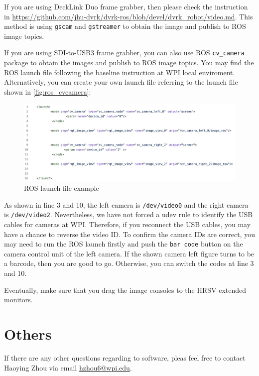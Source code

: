 If you are using DeckLink Duo frame grabber, then please check the instruction in \url{https://github.com/jhu-dvrk/dvrk-ros/blob/devel/dvrk_robot/video.md}. This method is using \texttt{gscam} and \texttt{gstreamer} to obtain the image and publish to ROS image topics.

If you are using SDI-to-USB3 frame grabber, you can also use ROS \texttt{cv\_camera} package to obtain the images and publish to ROS image topics. You may find the ROS launch file following the baseline instruction at WPI local enviroment. Alternatively, you can create your own launch file referring to the launch file shown in \autoref{fig:ros_cvcamera}:

\begin{figure}[H]
    \centering
    \includegraphics[width=0.95\linewidth]{figures/roslaunch_cvcamera.jpg}
    \caption{ROS launch file example}
    \label{fig:ros_cvcamera}
\end{figure}

As shown in line 3 and 10, the left camera is \texttt{\slash dev\slash video0} and the right camera is \texttt{\slash dev\slash video2}. Nevertheless, we have not forced a udev rule to identify the USB cables for cameras at WPI. Therefore, if you reconnect the USB cables, you may have a chance to reverse the video ID. To confirm the camera IDs are correct, you may need to run the ROS launch firstly and push the \texttt{bar code} button on the camera control unit of the left camera. If the shown camera left figure turns to be a barcode, then you are good to go. Otherwise, you can switch the codes at line 3 and 10.

Eventually, make sure that you drag the image consoles to the HRSV extended monitors.

\section{Others}

If there are any other questions regarding to software, pleas feel free to contact Haoying Zhou via email  \href{mailto:hzhou6@wpi.edu}{hzhou6@wpi.edu}.


